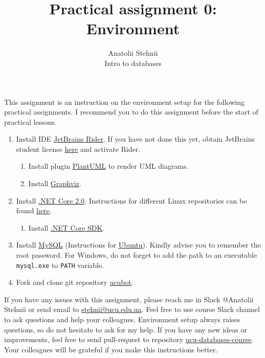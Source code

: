 \documentclass[12pt]{article}
\newcommand{\code}[1]{\texttt{#1}}
\begin{document}
\title{Practical assignment 0: Environment}
\author{Anatolii Stehnii\\Intro to databases}
\maketitle

This assignment is an instruction on the environment setup for the following practical assignments. I recommend you to do this assignment before the start of practical lessons.

\begin{enumerate}
\item Install IDE \href{https://www.jetbrains.com/rider/download/}{JetBrains Rider}. If you have not done this yet, obtain JetBrains student license \href{https://www.jetbrains.com/student/}{here} and activate Rider.
\begin{enumerate}
\item Install plugin \href{https://plugins.jetbrains.com/plugin/7017-plantuml-integration}{PlantUML} to render UML diagrams.
\item Install \href{http://www.graphviz.org/download/}{Graphviz}.
\end{enumerate}
\item Install \href{https://www.microsoft.com/net/learn/get-started}{.NET Core 2.0}. Instructions for different Linux repositories can be found  \href{https://docs.microsoft.com/ru-ru/dotnet/core/linux-prerequisites?tabs=netcore2x}{here}.
\begin{enumerate}
\item Install \href{https://github.com/dotnet/core/blob/master/release-notes/download-archives/1.0.4-sdk-download.md}{.NET Core SDK}.
\end{enumerate}
\item Install \href{https://www.mysql.com/}{MySQL} (Instructions for \href{https://www.digitalocean.com/community/tutorials/how-to-install-mysql-on-ubuntu-16-04}{Ubuntu}). Kindly advise you to remember the root password. For Windows, do not forget to add the path to an executable \code{mysql.exe} to \code{PATH} variable.
\item Fork and clone git repository \href{https://github.com/tsdaemon/ucubot}{ucubot}.

\end{enumerate}

If you have any issues with this assignment, please reach me in Slack @Anatolii Stehnii or send email to \href{mailto:stehnii@ucu.edu.ua}{stehnii@ucu.edu.ua}. Feel free to use course Slack channel to ask questions and help your colleagues. Environment setup always raises questions, so do not hesitate to ask for my help. If you have any new ideas or improvements, feel free to send pull-request to repository \href{https://github.com/tsdaemon/ucu-databases-course}{ucu-databases-course}. Your colleagues will be grateful if you make this instructions better.
\end{document}
